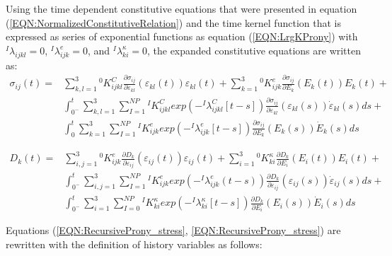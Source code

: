 Using the time dependent constitutive equations that were presented in equation (\ref{EQN:NormalizedConstitutiveRelation}) and the time kernel function that is expressed as series of exponential functions as equation (\ref{EQN:LrgKProny}) with $ {}^{I}\lambda_{ijkl}=0$, $ {}^{I}\lambda_{ijk}^{e}=0$, and $ {}^{I}\lambda_{ki}^{\kappa}=0$, 
the expanded constitutive equations are written as:
\begin{equation}
\begin{aligned} 
\sigma_{ij}(t)=
&\sum_{k,l=1}^{3} {}^{0}K_{ijkl}^{C} 
\frac{\partial \sigma_{ij}}{\partial \varepsilon_{kl}}(\varepsilon_{kl}(t)) \varepsilon_{kl}(t)+
\sum_{k=1}^{3}
{}^{0}K_{ijk}^{e}\frac{\partial \sigma_{ij}}{\partial E_{k}}(E_{k} (t)) E_{k} (t) +\\
&\int_{0^-}^t 
\sum_{k,l=1}^{3} 
\sum_{I=1}^{NP}{}^{I}K_{ijkl}^{C} exp(-{}^{I}\lambda_{ijkl}^{C}[t-s]) 
\frac{\partial \sigma_{ij}}{\partial
\varepsilon_{kl}}(\varepsilon_{kl}(s)) \dot{\varepsilon}_{kl}(s)ds +\\
&\int_{0}^t 
\sum_{k=1}^{3}
\sum_{I=1}^{NP}
{}^{I}K_{ijk}^{e}
exp(-{}^{I}\lambda_{ijk}^{e}[t-s]) \frac{\partial \sigma_{ij}}{\partial E_{k}} (E_{k} (s)) \dot{E}_{k} (s)ds
\end{aligned}
\label{EQN:RecursiveProny_stress}
\end{equation}

\begin{equation}
\begin{aligned} 
D_k(t)=
&\sum_{i,j=1}^{3}
{}^{0}K_{ijk}^{e}\frac{\partial
D_{k}}{\partial \varepsilon_{ij}} (\varepsilon_{ij}(t)) \varepsilon_{ij}(t)+
\sum_{i=1}^{3}
{}^{0}K_{ki}^{\kappa}\frac{\partial D_{k}}{\partial E_{i}}(E_{i} (t)) E_{i} (t)+\\
&\int_{0^-}^t 
\sum_{i,j=1}^{3}  
\sum_{I=1}^{NP}
{}^{I}K_{ijk}^{e} exp(-{}^{I}\lambda_{ijk}^{e}(t-s))
\frac{\partial D_{k}}{\partial \varepsilon_{ij}}(\varepsilon_{ij}(s))\dot{\varepsilon}_{ij}(s)ds+\\
&\int_{0^-}^t 
\sum_{i=1}^{3} 
\sum_{I=0}^{NP}
{}^{I}K_{ki}^{\kappa}exp(-{}^{I}\lambda_{ki}^{\kappa}[t-s]) \frac{\partial D_{k}}{\partial E_{i}} (E_{i} (s)) \dot{E}_{i} (s)ds
\end{aligned}
\label{EQN:RecursiveProny_elect_disp}
\end{equation}

Equations (\ref{EQN:RecursiveProny_stress}, \ref{EQN:RecursiveProny_stress}) are rewritten with the definition of history variables as follows:

